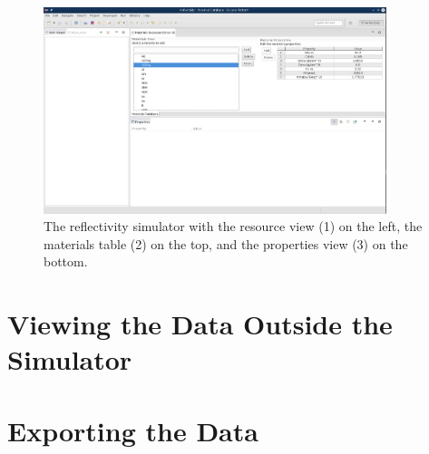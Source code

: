 \begin{figure}[!h]
\centering
\includegraphics[width=10cm]{images/materialsDatabase.png}
\caption{The reflectivity simulator with the resource view (1) on the left, the
materials table (2) on the top, and the properties view (3) on the bottom.}
\label{matDB}
\end{figure}

\section{Viewing the Data Outside the Simulator}
\label{viz}

\section{Exporting the Data}
\label{export}
